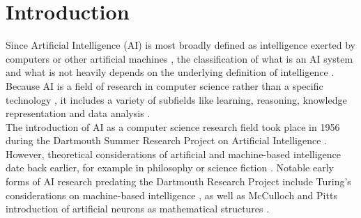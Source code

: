 \documentclass[a4paper, conference]{IEEEtran}
\begin{document}

\maketitle

\IEEEoverridecommandlockouts

%
\IEEEpeerreviewmaketitle



\section{Introduction}
Since Artificial Intelligence (AI) is most broadly defined as intelligence exerted by computers or other artificial machines \cite[p. 29]{aiModernApproach}, the classification of what is an AI system and what is not heavily depends on the underlying definition of intelligence \cite[p. 31]{aiModernApproach}. Because AI is a field of research in computer science rather than a specific technology \cite[p. 1]{aiStructuresStrategies}, it includes a variety of subfields like learning, reasoning, knowledge representation and data analysis \cite[pp. 20-30]{aiStructuresStrategies}.\\

The introduction of AI as a computer science research field took place in 1956 during the Dartmouth Summer Research Project on Artificial Intelligence \cite{dartmouthFiftyYears}. However, theoretical considerations of artificial and machine-based intelligence date back earlier, for example in philosophy \cite[pp. 5-6]{Flasiński2016} or science fiction \cite[pp. 29-40]{riseOfSelfReplicators}. Notable early forms of AI research predating the Dartmouth Research Project include Turing's considerations on machine-based intelligence \cite{Turing1950ComputingMA}, as well as McCulloch and Pitts introduction of artificial neurons as mathematical structures \cite{mcculloch43a}.\\
\end{document}
